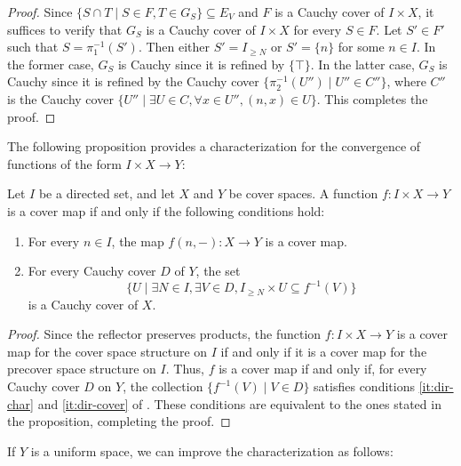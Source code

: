 \documentclass[reqno]{amsart}
\theoremstyle{definition}
\theoremstyle{remark}
\numberwithin{figure}{section}
\begin{document}
\begin{proof}
Since $\{ S \cap T \mid S \in F, T \in G_S \} \subseteq E_V$ and $F$ is a Cauchy cover of $I \times X$,
it suffices to verify that $G_S$ is a Cauchy cover of $I \times X$ for every $S \in F$.
Let $S' \in F'$ such that $S = \pi_1^{-1}(S')$.
Then either $S' = I_{\geq N}$ or $S' = \{ n \}$ for some $n \in I$.
In the former case, $G_S$ is Cauchy since it is refined by $\{ \top \}$.
In the latter case, $G_S$ is Cauchy since it is refined by the Cauchy cover $\{ \pi_2^{-1}(U'') \mid U'' \in C'' \}$,
where $C''$ is the Cauchy cover $\{ U'' \mid \exists U \in C, \forall x \in U'', (n,x) \in U \}$.
This completes the proof.
\end{proof}

The following proposition provides a characterization for the convergence of functions of the form $I \times X \to Y$:

\begin{prop}
Let $I$ be a directed set, and let $X$ and $Y$ be cover spaces.
A function $f : I \times X \to Y$ is a cover map if and only if the following conditions hold:
\begin{enumerate}
\item For every $n \in I$, the map $f(n, -) : X \to Y$ is a cover map.
\item For every Cauchy cover $D$ of $Y$, the set
        \[ \{ U \mid \exists N \in I, \exists V \in D, I_{\geq N} \times U \subseteq f^{-1}(V) \} \]
        is a Cauchy cover of $X$.
\end{enumerate}
\end{prop}
\begin{proof}
Since the reflector preserves products, the function $f : I \times X \to Y$ is a cover map for the cover space structure on $I$ if and only if it is a cover map for the precover space structure on $I$.
Thus, $f$ is a cover map if and only if, for every Cauchy cover $D$ on $Y$, the collection $\{ f^{-1}(V) \mid V \in D \}$ satisfies conditions \eqref{it:dir-char} and \eqref{it:dir-cover} of .
These conditions are equivalent to the ones stated in the proposition, completing the proof.
\end{proof}

If $Y$ is a uniform space, we can improve the characterization as follows:
\end{document}
